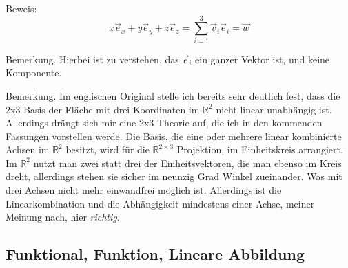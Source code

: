 \documentclass[a4paper]{article}
\begin{document}
Beweis:\\

\begin{displaymath}
x\vec{e}_{x} + y\vec{e}_{y} + z\vec{e}_{z} = \sum_{i=1}^{3}\vec{v}_{i}\vec{e}_{i} = \vec{w} 
\end{displaymath}

Bemerkung. Hierbei ist zu verstehen, das $\vec{e}_{i}$ ein ganzer Vektor ist, und keine Komponente.

Bemerkung. Im englischen Original stelle ich bereits sehr deutlich fest, dass die 2x3 Basis der Fl\"ache mit drei Koordinaten im $\mathbb{R}^{2}$ nicht linear unabh\"angig ist. Allerdings dr\"angt sich mir eine 2x3 Theorie auf, die ich in den kommenden Fassungen vorstellen werde. Die Basis, die eine oder mehrere linear kombinierte Achsen im $\mathbb{R}^{2}$ besitzt, wird f\"ur die $\mathbb{R}^{2\times3}$ Projektion, im Einheitskreis arrangiert. Im $\mathbb{R}^{2}$ nutzt man zwei statt drei der Einheitsvektoren, die man ebenso im Kreis dreht, allerdings stehen sie sicher im neunzig Grad Winkel zueinander. Was mit drei Achsen nicht mehr einwandfrei m\"oglich ist. Allerdings ist die Linearkombination und die Abh\"angigkeit mindestens einer Achse, meiner Meinung nach, hier \emph{richtig}.


\subsection{Funktional, Funktion, Lineare Abbildung}

\end{document}
